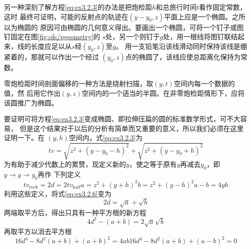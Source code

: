 另一种深刻了解方程\ref{eq:ex3.2.3}的办法是把炮检距$h$和总旅行时间$t$看作固定常数，这时
最终可证明，可能的反射点的轨迹在$(y-y_0,z)$平面上应是一个椭圆。之所以为椭圆的
原因可由椭圆的几何意义得出。要画出一个椭圆，可将一个钉子或图钉固定在图\ref{fig:ofs/pgeometry}的
$s$处，另一个则钉于$g$处，用一根线将图钉联结起来，线的长度应足以从$s$经$(y_0,z)$至$g$。
用一支铅笔沿该线滑动同时保持该线是绷紧着的，那就可以作出一个经过
$(y_0,z)$点的椭圆了，该线应使总距离化保持为常数。

零炮检距时间剖面偏移的一种方法是绕射扫描，取$(y,t)$空间内每一个数据的值，然
后用它作出$(y,z)$空间内的一个适当的半圆。在非零炮检距情形下，应将该圆推广为椭圆。

要证明可将方程\ref{eq:ex3.2.3}变成椭圆、即拉伸压扁的圆的标准数学形式，可不大容易，
但是这个结果对于以后的分析有简单而又重要的意义，所以我们必须在这里证明一下。在
$(y,h)$空间内，式\ref{eq:ex3.2.3}为
\begin{equation}
tv=\sqrt{z^2+(y-y_0-h)^2}+\sqrt{z^2+(y-y_0+h)^2}
\label{eq:ex3.2.6}
\end{equation}
为有助于减少代数上的累赞，现定义新的$y$，使之等于原有$y$再减去$y_0$，即$y\rightarrow y\rightarrow y_0$再作
下列定义
\begin{subequations}
\begin{equation}
tv_{\text{rock}}=2d=2tv_{\text{half}}
\label{eq:ex3.2.7a}
\end{equation}
\begin{equation}
a=z^2+(y+h)^2
\label{eq:ex3.2.7b}
\end{equation}
\begin{equation}
b=z^2+(y-h)^2
\label{eq:ex3.2.7c}
\end{equation}
\begin{equation}
a-b=4yh
\label{eq:ex3.2.7d}
\end{equation}
\label{eq:ex3.2.7}
\end{subequations}
利用这些定义，将式\ref{eq:ex3.2.6}变为
\begin{equation}
2d=\sqrt{a}+\sqrt{b}
\label{eq:ex3.2.8}
\end{equation}
两端取平方后，得出只具有一种平方根的新方程
\begin{equation}
4d^2-(a+b)=2\sqrt{a}\sqrt{b}
\label{eq:ex3.2.9}
\end{equation}
再取平方以消去平方根
\begin{subequations}
\begin{equation}
16d^4-8d^2(a+b)+(a+b)^2=4ab
\label{eq:ex3.2.10a}
\end{equation}
\begin{equation}
16d^4-8d^2(a+b)+(a-b)^2=0
\label{eq:ex3.2.10b}
\end{equation}
\label{eq:ex3.2.10}
\end{subequations}
